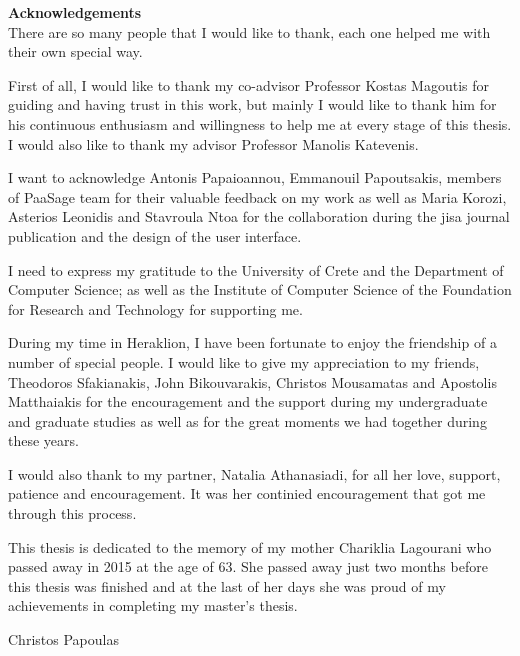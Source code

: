 \thispagestyle{empty}
\begin{titlepage}
{\bf\Large Acknowledgements}\\

There are so many people that I would like to thank, each one helped me
with their own special way. 

First of all, I would like to thank my co-advisor
Professor Kostas Magoutis for guiding and having trust in
this work, but mainly I would like to thank him for his continuous enthusiasm and willingness to
help me at every stage of this thesis. I would also like to thank my advisor Professor Manolis Katevenis.

I want to acknowledge Antonis Papaioannou, Emmanouil Papoutsakis, members of PaaSage team for their valuable feedback on my work as well as Maria Korozi, Asterios Leonidis and Stavroula Ntoa for the collaboration during the jisa journal publication and the design of the user interface.

I need to express my gratitude to the University of Crete and the Department
of Computer Science; as well as the Institute of Computer Science of the Foundation for Research and
Technology for supporting me.

During my time in Heraklion, I have been fortunate to enjoy the friendship
of a number of special people. I would like to give my appreciation to
my friends, Theodoros Sfakianakis, John Bikouvarakis, Christos Mousamatas and Apostolis Matthaiakis for the encouragement and the support during my undergraduate and graduate studies as well as for the great
moments we had together during these years.

I would also thank to my partner, Natalia Athanasiadi, for all her love, support, patience and encouragement. It was her continied encouragement that got me through this process.

\bigskip

This thesis is dedicated to the memory of my mother Chariklia Lagourani who passed away in 2015 at the age of 63. She passed away just two months before this thesis was finished and at the last of her days she was proud of my achievements in completing my master's thesis.

\begin{flushright}Christos Papoulas\end{flushright}
\vfill
\end{titlepage}
